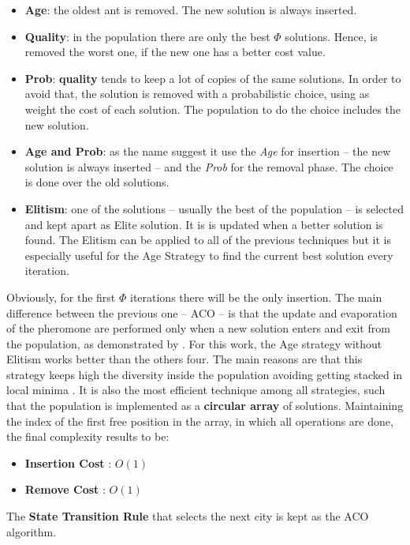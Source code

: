 \documentclass[a4paper,9pt,journal,twoside,compsoc]{PPIEEEtran}
\begin{document}
\begin{itemize}
\item \textbf{Age}: the oldest ant is removed. The new solution is always inserted.
\item \textbf{Quality}: in the population there are only the best $\Phi$ solutions. Hence, is removed the worst one, if the new one has a better cost value.
\item \textbf{Prob}: \textbf{quality} tends to keep a lot of copies of the same solutions. In order to avoid that, the solution is removed with a probabilistic choice, using as weight the cost of each solution. The population to do the choice includes the new solution.
\item \textbf{Age and Prob}: as the name suggest it use the \textit{Age} for insertion -- the new solution is always inserted -- and the \textit{Prob} for the removal phase. The choice is done over the old solutions.
\item \textbf{Elitism}: one of the solutions -- usually the best of the population -- is selected and kept apart as Elite solution. It is is updated when a better solution is found. The Elitism can be applied to all of the previous techniques but it is especially useful for the Age Strategy to find the current best solution every iteration.
\end{itemize}


Obviously, for the first $\Phi$ iterations there will be the only insertion.
The main difference between the previous one -- ACO -- is that the update and evaporation of the pheromone are performed only when a new solution enters and exit from the population, as demonstrated by \cite{ant2}. For this work, the Age strategy without Elitism works better than the others four. The main reasons are that this strategy keeps high the diversity inside the population avoiding getting stacked in local minima \cite{ant2}. It is also the most efficient technique among all strategies, such that the population is implemented as a \textbf{circular array} of solutions. Maintaining the index of the first free position in the array, in which all operations are done, the final complexity results to be:

\begin{itemize}
\item \textbf{Insertion Cost} : $O(1)$
\item \textbf{Remove Cost} : $O(1)$
\end{itemize}

The \textbf{State Transition Rule} that selects the next city is kept as the ACO algorithm.
 
\end{document}
